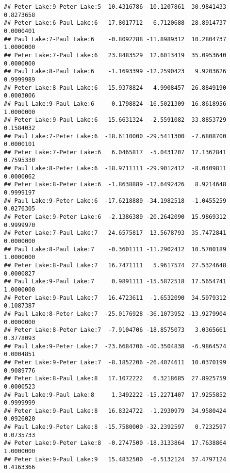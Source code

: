 \documentclass[]{article}
\begin{document}
\begin{verbatim}
## Peter Lake:9-Peter Lake:5  10.4316786 -10.1207861  30.9841433 0.8273658
## Peter Lake:6-Paul Lake:6   17.8017712   6.7120688  28.8914737 0.0000401
## Paul Lake:7-Paul Lake:6    -0.8092288 -11.8989312  10.2804737 1.0000000
## Peter Lake:7-Paul Lake:6   23.8483529  12.6013419  35.0953640 0.0000000
## Paul Lake:8-Paul Lake:6    -1.1693399 -12.2590423   9.9203626 0.9999989
## Peter Lake:8-Paul Lake:6   15.9378824   4.9908457  26.8849190 0.0003006
## Paul Lake:9-Paul Lake:6     0.1798824 -16.5021309  16.8618956 1.0000000
## Peter Lake:9-Paul Lake:6   15.6631324  -2.5591082  33.8853729 0.1584032
## Paul Lake:7-Peter Lake:6  -18.6110000 -29.5411300  -7.6808700 0.0000101
## Peter Lake:7-Peter Lake:6   6.0465817  -5.0431207  17.1362841 0.7595330
## Paul Lake:8-Peter Lake:6  -18.9711111 -29.9012412  -8.0409811 0.0000062
## Peter Lake:8-Peter Lake:6  -1.8638889 -12.6492426   8.9214648 0.9999197
## Paul Lake:9-Peter Lake:6  -17.6218889 -34.1982518  -1.0455259 0.0276305
## Peter Lake:9-Peter Lake:6  -2.1386389 -20.2642090  15.9869312 0.9999970
## Peter Lake:7-Paul Lake:7   24.6575817  13.5678793  35.7472841 0.0000000
## Paul Lake:8-Paul Lake:7    -0.3601111 -11.2902412  10.5700189 1.0000000
## Peter Lake:8-Paul Lake:7   16.7471111   5.9617574  27.5324648 0.0000827
## Paul Lake:9-Paul Lake:7     0.9891111 -15.5872518  17.5654741 1.0000000
## Peter Lake:9-Paul Lake:7   16.4723611  -1.6532090  34.5979312 0.1087387
## Paul Lake:8-Peter Lake:7  -25.0176928 -36.1073952 -13.9279904 0.0000000
## Peter Lake:8-Peter Lake:7  -7.9104706 -18.8575073   3.0365661 0.3778093
## Paul Lake:9-Peter Lake:7  -23.6684706 -40.3504838  -6.9864574 0.0004851
## Peter Lake:9-Peter Lake:7  -8.1852206 -26.4074611  10.0370199 0.9089776
## Peter Lake:8-Paul Lake:8   17.1072222   6.3218685  27.8925759 0.0000523
## Paul Lake:9-Paul Lake:8     1.3492222 -15.2271407  17.9255852 0.9999999
## Peter Lake:9-Paul Lake:8   16.8324722  -1.2930979  34.9580424 0.0926020
## Paul Lake:9-Peter Lake:8  -15.7580000 -32.2392597   0.7232597 0.0735733
## Peter Lake:9-Peter Lake:8  -0.2747500 -18.3133864  17.7638864 1.0000000
## Peter Lake:9-Paul Lake:9   15.4832500  -6.5132124  37.4797124 0.4163366
\end{verbatim}
\end{document}
